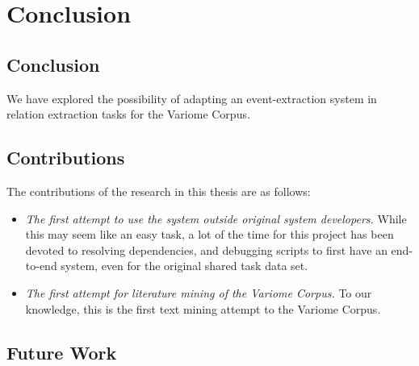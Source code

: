 \chapter{Conclusion}  %

\ifpdf
    \graphicspath{{Conclusion/Figs/Raster/}{Conclusion/Figs/PDF/}{Conclusion/Figs/}}
\else
    \graphicspath{{Conclusion/Figs/Vector/}{Conclusion/Figs/}}
\fi

\section{Conclusion} %
We have explored the possibility of adapting an event-extraction system in relation extraction tasks for the Variome Corpus. 

\section{Contributions}
The contributions of the research in this thesis are as follows:
\begin{itemize}
	\item \emph{The first attempt to use the system outside original system developers.} While this may seem like an easy task, a lot of the time for this project has been devoted to resolving dependencies, and debugging scripts to first have an end-to-end system, even for the original shared task data set.
	\item \emph{The first attempt for literature mining of the Variome Corpus.} To our knowledge, this is the first text mining attempt to the Variome Corpus. 
\end{itemize}
\section{Future Work}
